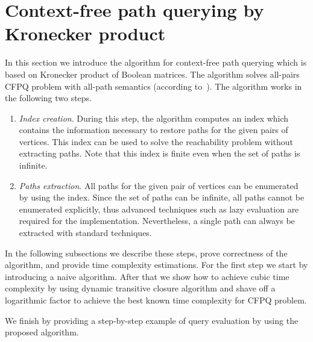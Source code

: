 \section{Context-free path querying by Kronecker product}


In this section we introduce the algorithm for context-free path querying which is based on Kronecker product of Boolean matrices.
The algorithm solves all-pairs CFPQ problem with all-path semantics (according to~\cite{hellingsPathQuerying}).
The algorithm works in the following two steps.
\begin{enumerate}
\item \emph{Index creation}.
 During this step, the algorithm computes an index which contains the information necessary to restore paths for the given pairs of vertices.
 This index can be used to solve the reachability problem without extracting paths.
 Note that this index is finite even when the set of paths is infinite.
\item \emph{Paths extraction}.
All paths for the given pair of vertices can be enumerated by using the index.
Since the set of paths can be infinite, all paths cannot be enumerated explicitly, thus advanced techniques such as lazy evaluation are required for the implementation.
Nevertheless, a single path can always be extracted with standard techniques.
\end{enumerate}

In the following subsections we describe these steps, prove correctness of the algorithm, and provide time complexity estimations.
For the first step we start by introducing a naive algorithm.
After that we show how to achieve cubic time complexity by using dynamic transitive closure algorithm and shave off a logarithmic factor to achieve the best known time complexity for CFPQ problem.

We finish by providing a step-by-step example of query evaluation by using the proposed algorithm.



